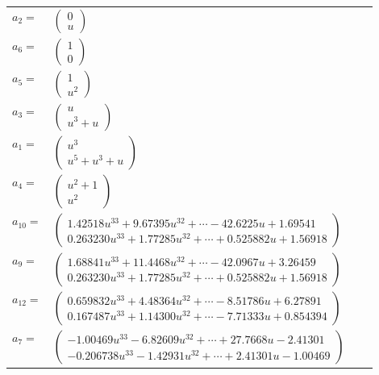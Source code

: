 \documentclass[1p]{elsarticle_modified}
\theoremstyle{definition}
\begin{document}
\begin{tabular}{m{7pt} m{180pt} m{7pt} m{180pt} }
\flushright $a_{2}=$&$\begin{pmatrix}0\\u\end{pmatrix}$ \\
\flushright $a_{6}=$&$\begin{pmatrix}1\\0\end{pmatrix}$ \\
\flushright $a_{5}=$&$\begin{pmatrix}1\\u^2\end{pmatrix}$ \\
\flushright $a_{3}=$&$\begin{pmatrix}u\\u^3+u\end{pmatrix}$ \\
\flushright $a_{1}=$&$\begin{pmatrix}u^3\\u^5+u^3+u\end{pmatrix}$ \\
\flushright $a_{4}=$&$\begin{pmatrix}u^2+1\\u^2\end{pmatrix}$ \\
\flushright $a_{10}=$&$\begin{pmatrix}1.42518 u^{33}+9.67395 u^{32}+\cdots-42.6225 u+1.69541\\0.263230 u^{33}+1.77285 u^{32}+\cdots+0.525882 u+1.56918\end{pmatrix}$ \\
\flushright $a_{9}=$&$\begin{pmatrix}1.68841 u^{33}+11.4468 u^{32}+\cdots-42.0967 u+3.26459\\0.263230 u^{33}+1.77285 u^{32}+\cdots+0.525882 u+1.56918\end{pmatrix}$ \\
\flushright $a_{12}=$&$\begin{pmatrix}0.659832 u^{33}+4.48364 u^{32}+\cdots-8.51786 u+6.27891\\0.167487 u^{33}+1.14300 u^{32}+\cdots-7.71333 u+0.854394\end{pmatrix}$ \\
\flushright $a_{7}=$&$\begin{pmatrix}-1.00469 u^{33}-6.82609 u^{32}+\cdots+27.7668 u-2.41301\\-0.206738 u^{33}-1.42931 u^{32}+\cdots+2.41301 u-1.00469\end{pmatrix}$ \\

\end{tabular}
\end{document}
